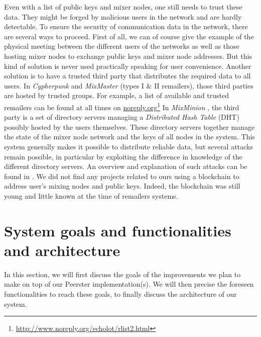 \documentclass[11pt, a4paper]{article}
\begin{document}
        Even with a list of public keys and mixer nodes, one still needs to trust these data.
        They might be forged by malicious users in the network and are hardly detectable.
        To ensure the security of communication data in the network, there are several ways to proceed.
        First of all, we can of course give the example of the physical meeting between the different users of the networks as well as those hosting mixer nodes to exchange public keys and mixer node addresses.
        But this kind of solution is never used practically speaking for user convenience.
        Another solution is to have a trusted third party that distributes the required data to all users.
        In \textit{Cypherpunk} and \textit{MixMaster} (types I \& II remailers), those third parties are hosted by trusted groups.
        For example, a list of available and trusted remailers can be found at all times on \url{noreply.org}\footnote{\url{http://www.noreply.org/echolot/rlist2.html}}
        \bigbreak
        In \textit{MixMinion} \cite{mixminion}, the third party is a set of directory servers managing a \textit{Distributed Hash Table} (DHT) possibly hosted by the users themselves.
        These directory servers together manage the state of the mixer node network and the keys of all nodes in the system.
        This system generally makes it possible to distribute reliable data, but several attacks remain possible, in particular by exploiting the difference in knowledge of the different directory servers.
        An overview and explanation of such attacks can be found in \cite[Section 6]{mixminion}.
        \bigbreak
        We did not find any projects related to ours using a blockchain to address user's mixing nodes and public keys.
        Indeed, the blockchain was still young and little known at the time of remailers systems.


\section{System goals and functionalities and architecture}

    In this section, we will first discuss the goals of the improvements we plan to make on top of our Peerster implementation(s).
    We will then precise the foreseen functionalities to reach these goals, to finally discuss the architecture of our system.
\end{document}
